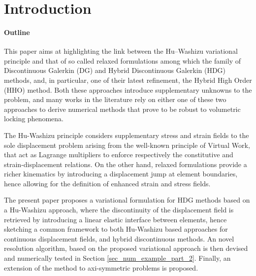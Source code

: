 \section{Introduction}
\label{sec_introduction}

\paragraph{Outline}

This paper aims at highlighting the link between the Hu–Washizu
variational principle and that of so called relaxed formulations
among which the family of Discontinuous Galerkin (DG) and Hybrid Discontinuous Galerkin
(HDG) methods, and, in particular, one of their latest refinement, the
Hybrid High Order (HHO) method.
Both these approaches introduce supplementary unknowns to the problem, and many works in the literature rely on either one of these two approaches to derive numerical methods that prove to be robust to volumetric locking phenomena.

The Hu-Washizu principle considers supplementary stress and strain fields to the sole displacement problem arising from the well-known principle of Virtual Work, that act as Lagrange multipliers to enforce respectively the constitutive and strain-displacement relations.
On the other hand, relaxed formulations provide a richer kinematics by introducing a displacement jump at element boundaries, hence allowing for the definition of enhanced strain and stress fields.

The present paper proposes a variational formulation for HDG methods based on a Hu-Washizu approach, where the discontinuity of the displacement field is
retrieved by introducing a linear elastic interface between elements, hence sketching a common framework to both Hu-Washizu based approaches for continuous displacement fields, and hybrid discontinuous methods.
An novel resolution algorithm, based on the proposed variational approach is then devised and numerically tested in Section \ref{sec_num_example_part_2}.
Finally, an extension of the method to axi-symmetric problems is proposed.


